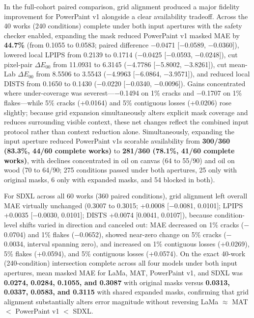 \documentclass[applsci,article,submit,pdftex,moreauthors]{Definitions/mdpi}
\begin{document}
In the full-cohort paired comparison, grid alignment produced a major fidelity improvement for PowerPaint v1 alongside a clear availability tradeoff. Across the 40 works (240 conditions) complete under both input apertures with the safety checker enabled, expanding the mask reduced PowerPaint v1 masked MAE by \textbf{44.7\%} (from 0.1055 to 0.0583; paired difference \ensuremath{-}0.0471 {[}\ensuremath{-}0.0589, \ensuremath{-}0.0360{]}), lowered local LPIPS from 0.2139 to 0.1714 (\ensuremath{-}0.0425 {[}\ensuremath{-}0.0593, \ensuremath{-}0.0248{]}), cut pixel-pair \texttt{\ensuremath{\Delta E_{00}}} from 11.0931 to 6.3145 (\ensuremath{-}4.7786 {[}\ensuremath{-}5.8002, \ensuremath{-}3.8261{]}), cut mean-Lab \texttt{\ensuremath{\Delta E_{00}}} from 8.5506 to 3.5543 (\ensuremath{-}4.9963 {[}\ensuremath{-}6.0864, \ensuremath{-}3.9571{]}), and reduced local DISTS from 0.1650 to 0.1430 (\ensuremath{-}0.0220 {[}\ensuremath{-}0.0340, \ensuremath{-}0.0096{]}). Gains concentrated where under-coverage was severest---\ensuremath{-}0.1494 on 1\% cracks and \ensuremath{-}0.1707 on 1\% flakes---while 5\% cracks (+0.0164) and 5\% contiguous losses (+0.0206) rose slightly; because grid expansion simultaneously alters explicit mask coverage and reduces surrounding visible context, these net changes reflect the combined input protocol rather than context reduction alone. Simultaneously, expanding the input aperture reduced PowerPaint v1\textquotesingle s scorable availability from \textbf{300/360 (83.3\%, 44/60 complete works)} to \textbf{281/360 (78.1\%, 41/60 complete works)}, with declines concentrated in oil on canvas (64 to 55/90) and oil on wood (70 to 64/90; 275 conditions passed under both apertures, 25 only with original masks, 6 only with expanded masks, and 54 blocked in both).

For SDXL across all 60 works (360 paired conditions), grid alignment left overall MAE virtually unchanged (0.3007 to 0.3015; +0.0008 {[}\ensuremath{-}0.0081, 0.0101{]}; LPIPS +0.0035 {[}\ensuremath{-}0.0030, 0.0101{]}; DISTS +0.0074 {[}0.0041, 0.0107{]}), because condition-level shifts varied in direction and canceled out: MAE decreased on 1\% cracks (\ensuremath{-}0.0704) and 1\% flakes (\ensuremath{-}0.0652), showed near-zero change on 5\% cracks (\ensuremath{-}0.0034, interval spanning zero), and increased on 1\% contiguous losses (+0.0269), 5\% flakes (+0.0594), and 5\% contiguous losses (+0.0574). On the exact 40-work (240-condition) intersection complete across all four models under both input apertures, mean masked MAE for LaMa, MAT, PowerPaint v1, and SDXL was \textbf{0.0274, 0.0284, 0.1055, and 0.3087} with original masks versus \textbf{0.0313, 0.0337, 0.0583, and 0.3115} with shared expanded masks, confirming that grid alignment substantially alters error magnitude without reversing LaMa \(\approx\) MAT \(\!<\!\) PowerPaint v1 \(\!<\!\) SDXL.
\end{document}
